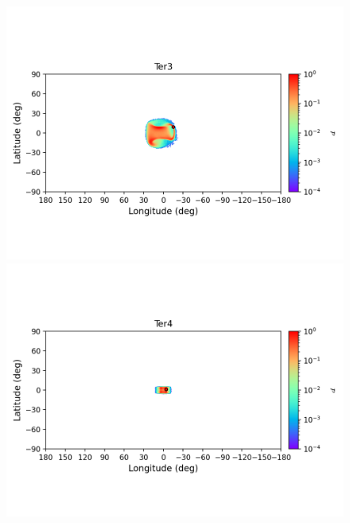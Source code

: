 \begin{figure}
\begin{center}
                \includegraphics[clip=true, trim = 0mm 20mm 0mm 10mm, width=1\columnwidth]{images/error_plots_Ter3.png}
                \includegraphics[clip=true, trim = 0mm 20mm 0mm 10mm, width=1\columnwidth]{images/error_plots_Ter4.png}
                

\end{center}
\end{figure}
